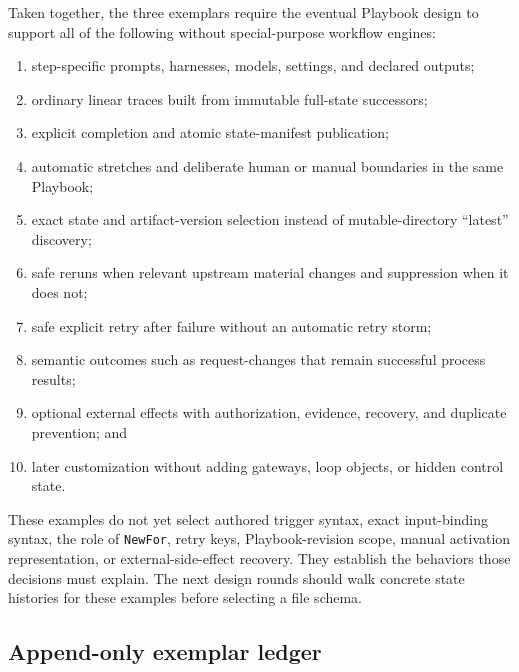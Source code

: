 \documentclass[11pt]{article}
\newcommand{\artifact}[1]{\texttt{#1}}
\begin{document}
Taken together, the three exemplars require the eventual Playbook design to support all of the following without special-purpose workflow engines:

\begin{enumerate}
  \item step-specific prompts, harnesses, models, settings, and declared outputs;
  \item ordinary linear traces built from immutable full-state successors;
  \item explicit completion and atomic state-manifest publication;
  \item automatic stretches and deliberate human or manual boundaries in the same Playbook;
  \item exact state and artifact-version selection instead of mutable-directory ``latest'' discovery;
  \item safe reruns when relevant upstream material changes and suppression when it does not;
  \item safe explicit retry after failure without an automatic retry storm;
  \item semantic outcomes such as request-changes that remain successful process results;
  \item optional external effects with authorization, evidence, recovery, and duplicate prevention; and
  \item later customization without adding gateways, loop objects, or hidden control state.
\end{enumerate}

\begin{warningbox}
These examples do not yet select authored trigger syntax, exact input-binding syntax, the role of \artifact{NewFor}, retry keys, Playbook-revision scope, manual activation representation, or external-side-effect recovery. They establish the behaviors those decisions must explain. The next design rounds should walk concrete state histories for these examples before selecting a file schema.
\end{warningbox}

\subsection{Append-only exemplar ledger}
\end{document}
